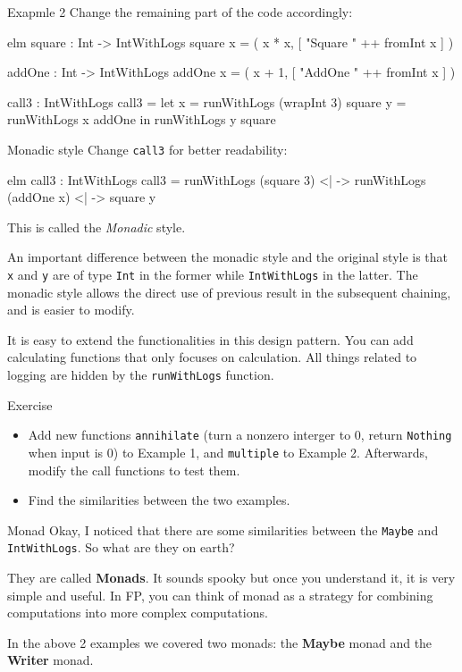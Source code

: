 \documentclass{beamer}
\begin{document}
\begin{frame}[fragile]{Exapmle 2}
	Change the remaining part of the code accordingly:
	\begin{codetbox}{elm}
square : Int -> IntWithLogs
square x =
    ( x * x, [ "Square " ++ fromInt x ] )

addOne : Int -> IntWithLogs
addOne x =
    ( x + 1, [ "AddOne " ++ fromInt x ] )

call3 : IntWithLogs
call3 =
  let
    x = runWithLogs (wrapInt 3) square
    y = runWithLogs x addOne
  in
    runWithLogs y square
	\end{codetbox}

\end{frame}

\begin{frame}[fragile]{Monadic style}
	Change {\tt call3} for better readability:
	\begin{codetbox}{elm}
call3 : IntWithLogs
call3 =
    runWithLogs (square 3) <| \x ->
    runWithLogs (addOne x) <| \y ->
    square y
	\end{codetbox}
	\pause
	This is called the \textit{Monadic} style.

	\pause
	An important difference between the monadic style and the original style
	is that {\tt x} and {\tt y} are of type {\tt Int} in the former while {\tt IntWithLogs} in the
	latter. The monadic style allows the direct use of previous result in the
	subsequent chaining, and is easier to modify.

	\pause
	It is easy to extend the functionalities in this design pattern. You can add
	calculating functions that only focuses on calculation. All things related
	to logging are hidden by the {\tt runWithLogs} function.
\end{frame}

\begin{frame}{Exercise}
	\begin{itemize}
		\item Add new functions {\tt annihilate} (turn a nonzero interger to 0, return {\tt Nothing} when input is 0) to Example 1, and {\tt multiple} to Example 2. Afterwards, modify the call functions to test them.
		\item Find the similarities between the two examples.
	\end{itemize}
\end{frame}


\begin{frame}{Monad}
	Okay, I noticed that there are some similarities between the {\tt Maybe} and
		{\tt IntWithLogs}. So what are they on earth?

	\medskip\pause

	They are called \textbf{Monads}. It sounds spooky but once you understand it,
	it is very simple and useful. In FP, you can think of monad as a strategy
	for combining computations into more complex computations.

	\medskip\pause



	In the above 2 examples we covered two monads: the \textbf{Maybe} monad and the \textbf{Writer} monad.
\end{frame}
\end{document}
